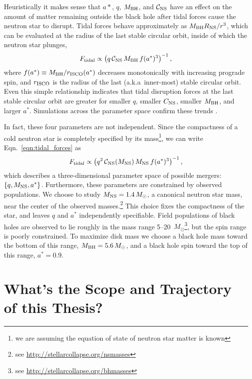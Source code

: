 Heuristically it makes sense that $a*$, $q$, $M_{\rm BH}$, and
$\mathcal{C}_{\rm NS}$ have an effect on the amount of matter remaining outside
the black hole after tidal forces cause the neutron star to disrupt.
Tidal forces behave approximately as $M_{\rm BH} R_{\rm NS}/r^3$,
which can be evaluated at the radius of the last stable circular orbit,
inside of which the neutron star plunges, 
\begin{equation}
  \label{eqn:tidal_forces}
  F_{\rm tidal} \propto
  \left(q \,\mathcal{C}_{\rm NS}\, M_{\rm BH} \,f(a^*)^3\right)^{-1},
\end{equation}
where $f(a^*) \equiv M_{\rm BH}/r_{\rm ISCO}(a^*)$ decreases monotonically with increasing
prograde spin, and $r_{\rm ISCO}$ is the radius of the last (a.k.a\ inner-most)
stable circular orbit. Even this simple relationship indicates that
tidal disruption forces at the last stable circular orbit are greater for smaller
$q$, smaller $C_{\rm NS}$, smaller $M_{\rm BH}$, and larger $a^*$.
Simulations across the parameter space confirm these trends
\citep{pann2010-disk_mass,fouc2012-disk_mass}.

In fact, these four parameters are not independent. Since the compactness of a
cold neutron star is completely specified by its mass\footnote{we are
assuming the equation of state of neutron star matter is known}, we can write
Eqn.~\ref{eqn:tidal_forces} as
\begin{equation}
  F_{\rm tidal} \propto
  \left(q^2 \,\mathcal{C}_{\rm NS}(M_{\rm NS})\, M_{\rm NS}\, f(a^*)^3\right)^{-1},
\end{equation}
which describes a three-dimensional parameter space of possible mergers:
$\{q,M_{\rm NS},a^*\}$.
Furthermore, these parameters are constrained by observed populations. We
choose to study $M_{\rm NS}=1.4\,M_{\odot}$, a canonical neutron star mass, near
the center of the observed masses.\footnote{see
\url{http://stellarcollapse.org/nsmasses}}
This choice fixes the compactness of the star, and leaves $q$ and $a^*$
independently specifiable.
Field populations of black holes are observed to lie roughly in the mass range
5--20~$M_\odot$\footnote{see \url{http://stellarcollapse.org/bhmasses}},
but the spin range is poorly constrained.
To maximize disk mass we choose a black hole mass toward the bottom of this
range, $M_{\rm BH}=5.6\,M_\odot$, and a black hole spin toward the top of this
range, $a^*=0.9$.

\section{What's the Scope and Trajectory of this Thesis?}
\label{sec:scope}

